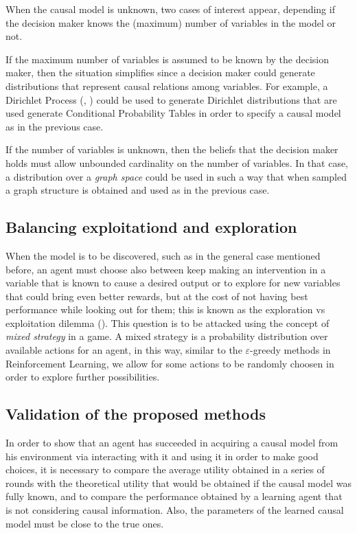 \documentclass[english,letterpaper,12pt,final]{article}
\theoremstyle{definition}
\begin{document}
When the causal model is unknown, two cases of interest appear, depending if the decision maker knows the (maximum) number of variables in the model or not. 

If the maximum number of variables is assumed to be known by the decision maker, then the situation simplifies since a decision maker could generate distributions that represent causal relations among variables. For example, a Dirichlet Process (\cite{ferguson1973bayesian}, \cite{ghosal2017fundamentals}) could be used to generate Dirichlet distributions that are used generate Conditional Probability Tables in order to specify a causal model as in the previous case.

If the number of variables is unknown, then the beliefs that the decision maker holds must allow unbounded cardinality on the number of variables. In that case, a distribution over a \textit{graph space} could be used in such a way that when sampled a graph structure is obtained and used as in the previous case.  

\subsection{Balancing exploitationd and exploration}
When the model is to be discovered, such as in the general case mentioned before, an agent must choose also between keep making an intervention in a variable that is known to cause a desired output or to explore for new variables that could bring even better rewards, but at the cost of not having best performance while looking out for them; this is known as the exploration vs exploitation dilemma (\cite{sutton1998reinforcement}). This question is to be attacked using the concept of \textit{mixed strategy} in a game. A mixed strategy is a probability distribution over available actions for an agent, in this way, similar to the $\varepsilon$-greedy methods in Reinforcement Learning, we allow for some actions to be randomly choosen in order to explore further possibilities.

\subsection{Validation of the proposed methods}
In order to show that an agent has succeeded in acquiring a causal model from his environment via interacting with it and using it in order to make good choices, it is necessary to compare the average utility obtained in a series of rounds with the theoretical utility that would be obtained if the causal model was fully known, and to compare the performance obtained by a learning agent that is not considering causal information. Also, the parameters of the learned causal model must be close to the true ones.
\end{document}
